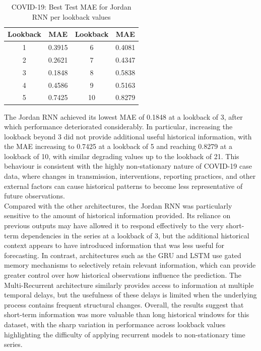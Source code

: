 \documentclass[conference]{IEEEtran}
\begin{document}
\begin{table}[H]
\centering
\caption{COVID-19: Best Test MAE for Jordan RNN per lookback values}
\label{tab:covid_lookback}
\begin{tabular}{cc|cc}
\toprule
Lookback & MAE & Lookback & MAE \\
\midrule
1 & 0.3915 & 6 & 0.4081 \\
2 & 0.2621 & 7 & 0.4347 \\
3 & 0.1848 & 8 & 0.5838 \\
4 & 0.4586 & 9 & 0.5163 \\
5 & 0.7425 & 10 & 0.8279 \\
\bottomrule
\end{tabular}
\end{table}

The Jordan RNN achieved its lowest MAE of 0.1848 at a lookback of 3, after which performance
deteriorated considerably. In particular, increasing the lookback beyond 3
did not provide additional useful historical information, with the MAE increasing
to 0.7425 at a lookback of 5 and reaching 0.8279 at a lookback of 10, with similar
degrading values up to the lookback of 21. This behaviour is consistent with the highly non-stationary nature of COVID-19
case data, where changes in transmission, interventions, reporting practices,
and other external factors can cause historical patterns to become less representative
of future observations.
\\
Compared with the other architectures, the Jordan RNN was particularly sensitive
to the amount of historical information provided. Its reliance on previous outputs
may have allowed it to respond effectively to the very short-term dependencies in
the series at a lookback of 3, but the additional historical context appears to have
introduced information that was less useful for forecasting. In contrast, architectures
such as the GRU and LSTM use gated memory mechanisms to selectively retain relevant
information, which can provide greater control over how historical observations influence
the prediction. The Multi-Recurrent architecture similarly provides access to information
at multiple temporal delays, but the usefulness of these delays is limited when the underlying
process contains frequent structural changes. Overall, the results suggest that short-term
information was more valuable than long historical windows for this dataset, with the sharp
variation in performance across lookback values highlighting the difficulty of applying recurrent
models to non-stationary time series.
\end{document}
